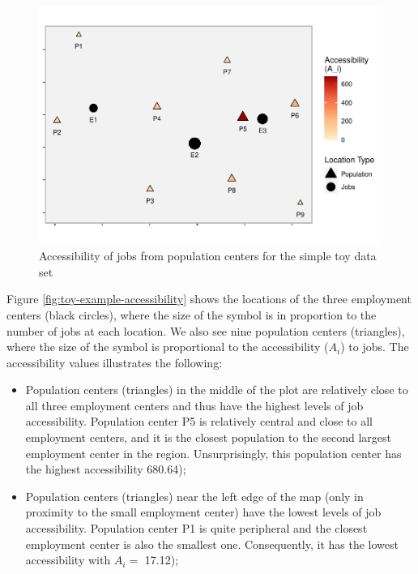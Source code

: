 \documentclass[]{elsarticle} %
\begin{document}
\begin{figure}
\includegraphics[width=1\linewidth]{Spatial-Availability_files/figure-latex/toy-example-accessibility-plot-1} \caption{\label{fig:toy-example-accessibility}Accessibility of jobs from population centers for the simple toy data set}\label{fig:toy-example-accessibility-plot}
\end{figure}

Figure \ref{fig:toy-example-accessibility} shows the locations of the
three employment centers (black circles), where the size of the symbol
is in proportion to the number of jobs at each location. We also see
nine population centers (triangles), where the size of the symbol is
proportional to the accessibility (\(A_i\)) to jobs. The accessibility
values illustrates the following:

\begin{itemize}
\item
  Population centers (triangles) in the middle of the plot are
  relatively close to all three employment centers and thus have the
  highest levels of job accessibility. Population center P5 is
  relatively central and close to all employment centers, and it is the
  closest population to the second largest employment center in the
  region. Unsurprisingly, this population center has the highest
  accessibility 680.64);
\item
  Population centers (triangles) near the left edge of the map (only in
  proximity to the small employment center) have the lowest levels of
  job accessibility. Population center P1 is quite peripheral and the
  closest employment center is also the smallest one. Consequently, it
  has the lowest accessibility with \(A_i=\) 17.12);
\end{itemize}
\end{document}
